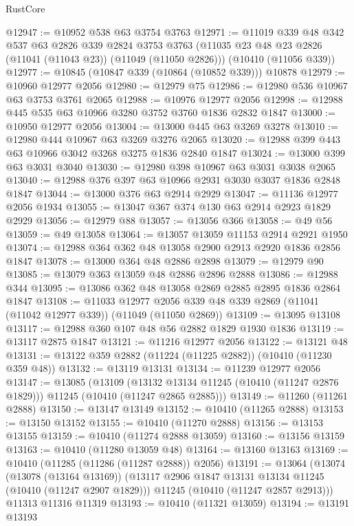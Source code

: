 \begin{lexlean}{RustCore}
\begin{coremodule}
@12947 := @10952 @538 @63 @3754 @3763
@12971 := @11019
    @339
    @48
    @342
    @537
    @63
    @2826
    @339
    @2824
    @3753
    @3763
    (@11035 @23 @48 @23 @2826 (@11041 (@11043 @23)) (@11049 (@11050 @2826)))
    (@10410 (@11056 @339))
@12977 := @10845 (@10847 @339 (@10864 (@10852 @339))) @10878
@12979 := @10960 @12977 @2056
@12980 := @12979 @75
@12986 := @12980 @536 @10967 @63 @3753 @3761 @2065
@12988 := @10976 @12977 @2056
@12998 := @12988 @445 @535 @63 @10966 @3280 @3752 @3760 @1836 @2832 @1847
@13000 := @10950 @12977 @2056
@13004 := @13000 @445 @63 @3269 @3278
@13010 := @12980 @444 @10967 @63 @3269 @3276 @2065
@13020 := @12988 @399 @443 @63 @10966 @3042 @3268 @3275 @1836 @2840 @1847
@13024 := @13000 @399 @63 @3031 @3040
@13030 := @12980 @398 @10967 @63 @3031 @3038 @2065
@13040 := @12988 @376 @397 @63 @10966 @2931 @3030 @3037 @1836 @2848 @1847
@13044 := @13000 @376 @63 @2914 @2929
@13047 := @11136 @12977 @2056 @1934
@13055 := @13047 @367 @374 @130 @63 @2914 @2923 @1829 @2929
@13056 := @12979 @88
@13057 := @13056 @366
@13058 := @49 @56
@13059 := @49 @13058
@13064 := @13057 @13059 @11153 @2914 @2921 @1950
@13074 := @12988 @364 @362 @48 @13058 @2900 @2913 @2920 @1836 @2856 @1847
@13078 := @13000 @364 @48 @2886 @2898
@13079 := @12979 @90
@13085 := @13079 @363 @13059 @48 @2886 @2896 @2888
@13086 := @12988 @344
@13095 := @13086 @362 @48 @13058 @2869 @2885 @2895 @1836 @2864 @1847
@13108 := @11033
    @12977
    @2056
    @339
    @48
    @339
    @2869
    (@11041 (@11042 @12977 @339))
    (@11049 (@11050 @2869))
@13109 := @13095 @13108
@13117 := @12988 @360 @107 @48 @56 @2882 @1829 @1930 @1836
@13119 := @13117 @2875 @1847
@13121 := @11216 @12977 @2056
@13122 := @13121 @48
@13131 := @13122 @359 @2882 (@11224 (@11225 @2882)) (@10410 (@11230 @359 @48))
@13132 := @13119 @13131
@13134 := @11239 @12977 @2056
@13147 := @13085
    (@13109
      (@13132 @13134 @11245 (@10410 (@11247 @2876 @1829)))
      @11245
      (@10410 (@11247 @2865 @2885)))
@13149 := @11260 (@11261 @2888)
@13150 := @13147 @13149
@13152 := @10410 (@11265 @2888)
@13153 := @13150 @13152
@13155 := @10410 (@11270 @2888)
@13156 := @13153 @13155
@13159 := @10410 (@11274 @2888 @13059)
@13160 := @13156 @13159
@13163 := @10410 (@11280 @13059 @48)
@13164 := @13160 @13163
@13169 := @10410 (@11285 (@11286 (@11287 @2888)) @2056)
@13191 := @13064
    (@13074
      (@13078 (@13164 @13169))
      (@13117 @2906 @1847 @13131 @13134 @11245 (@10410 (@11247 @2907 @1829)))
      @11245
      (@10410 (@11247 @2857 @2913)))
    @11313
    @11316
    @11319
@13193 := @10410 (@11321 @13059)
@13194 := @13191 @13193

\end{coremodule}
\end{lexlean}
